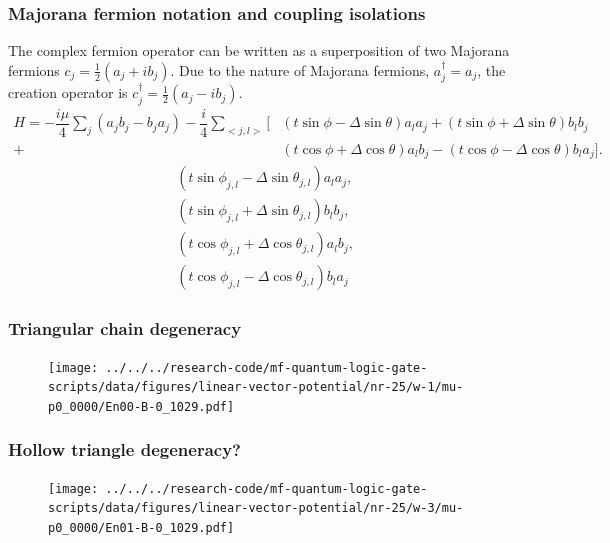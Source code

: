 \documentclass[xcolor=dvipsnames,10pt,aspectratio=169]{beamer}
\newcommand{\cc}{c^{\dagger}}
\newcommand{\de}{\Delta}
\begin{document}
  \begin{frame}
  \frametitle{Majorana fermion notation and coupling isolations}
    The complex fermion operator can be written as a superposition of two Majorana fermions $c_j = \frac{1}{2} (a_j + i b_j)$.
    Due to the nature of Majorana fermions, $a^{\dagger}_j = a_j$, the creation operator is $\cc_j = \frac{1}{2} (a_j - i b_j)$.
    \begin{align*}
      H = -\dfrac{i\mu}{4} \sum_j (a_j b_j - b_j a_j) - \dfrac{i}{4} \sum_{<j,l>} [&(t\sin\phi-\de\sin\theta) a_l a_j + (t\sin\phi+\de\sin\theta) b_l b_j \nonumber \\
      +&(t\cos\phi+\de\cos\theta) a_l b_j - (t\cos\phi-\de\cos\theta) b_l a_j].
    \end{align*}
    \begin{align}
      &(t \sin\phi_{j,l} - \de \sin\theta_{j,l}) a_l a_j, \\
      &(t \sin\phi_{j,l} + \de \sin\theta_{j,l}) b_l b_j, \\
      &(t \cos\phi_{j,l} + \de \cos\theta_{j,l}) a_l b_j, \\
      &(t \cos\phi_{j,l} - \de \cos\theta_{j,l}) b_l a_j
    \end{align}
  \end{frame}

  \begin{frame}
    \frametitle{Triangular chain degeneracy}

    \begin{figure}
      \texttt{[image: ../../../research-code/mf-quantum-logic-gate-scripts/data/figures/linear-vector-potential/nr-25/w-1/mu-p0\_0000/En00-B-0\_1029.pdf]}
    \end{figure}

  \end{frame}

  \begin{frame}
    \frametitle{Hollow triangle degeneracy?}

    \begin{figure}
      \texttt{[image: ../../../research-code/mf-quantum-logic-gate-scripts/data/figures/linear-vector-potential/nr-25/w-3/mu-p0\_0000/En01-B-0\_1029.pdf]}
    \end{figure}

  \end{frame}
\end{document}
